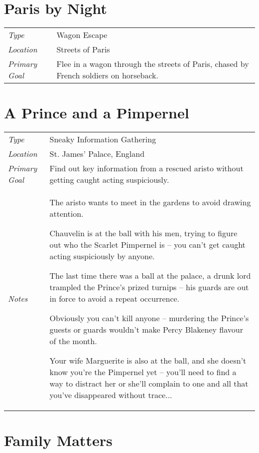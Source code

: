 \section{Paris by Night}

\begin{tabular}{lp{12cm}}
\emph{Type} & Wagon Escape \\
\emph{Location} & Streets of Paris \\
\emph{Primary Goal} & Flee in a wagon through the streets of Paris, chased by French soldiers on horseback.
\end{tabular}

\section{A Prince and a Pimpernel}

\begin{tabular}{lp{12cm}}
\emph{Type} & Sneaky Information Gathering \\
\emph{Location} & St. James' Palace, England \\
\emph{Primary Goal} & Find out key information from a rescued aristo without getting caught acting suspiciously. \\
\emph{Notes} &
  \vspace{-\baselineskip}
	\begin{list}{}{\leftmargin=1em}
	\item The aristo wants to meet in the gardens to avoid drawing attention.
	\item Chauvelin is at the ball with his men, trying to figure out who the Scarlet Pimpernel is -- you can't get caught acting suspiciously by anyone.
	\item The last time there was a ball at the palace, a drunk lord trampled the Prince's prized turnips -- his guards are out in force to avoid a repeat occurrence.
	\item Obviously you can't kill anyone -- murdering the Prince's guests or guards wouldn't make Percy Blakeney flavour of the month.
	\item Your wife Marguerite is also at the ball, and she doesn't know you're the Pimpernel yet -- you'll need to find a way to distract her or she'll complain to one and all that you've disappeared without trace...
	\end{list}
\end{tabular}

\section{Family Matters}

